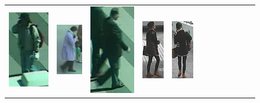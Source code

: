 \begin{figure}
\begin{tabular}{cccc|cccc|cccc}
\includegraphics[height=\reidheight]{Chapters/gradrev/figures/dataset_samples/PRID/b/img_0001.png}&
\includegraphics[height=\reidheight]{Chapters/gradrev/figures/dataset_samples/PRID/a/img_0002.png}&
\includegraphics[height=\reidheight]{Chapters/gradrev/figures/dataset_samples/PRID/b/img_0003.png}&
\includegraphics[height=\reidheight]{Chapters/gradrev/figures/dataset_samples/cuhk/a/001_00005.png}&
\includegraphics[height=\reidheight]{Chapters/gradrev/figures/dataset_samples/cuhk/b/001_00221.png}&

\end{tabular}
\end{figure}
